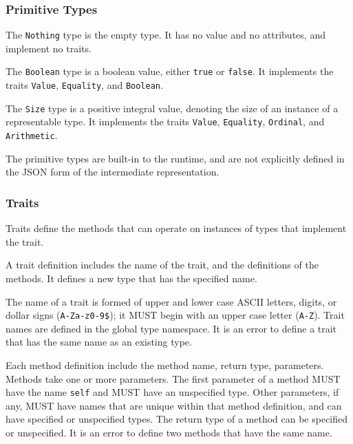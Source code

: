 \documentclass[10pt,twocolumn,a4paper]{article}
\newcommand{\code}[1]{\texttt{#1}}
\begin{document}
\subsubsection{Primitive Types}
\label{sec:primitives}

The \code{Nothing} type is the empty type. It has no value and no attributes,
and implement no traits.

The \code{Boolean} type is a boolean value, either \code{true} or \code{false}.
It implements the traits \code{Value}, \code{Equality}, and \code{Boolean}.

The \code{Size} type is a positive integral value, denoting the size of an
instance of a representable type. It implements the traits \code{Value},
\code{Equality}, \code{Ordinal}, and \code{Arithmetic}.

The primitive types are built-in to the runtime, and are not explicitly
defined in the JSON form of the intermediate representation.

\subsubsection{Traits}
\label{sec:traits}

Traits define the methods that can operate on instances of types that
implement the trait.

A trait definition includes the name of the trait, and the definitions
of the methods. It defines a new type that has the specified name.

The name of a trait is formed of upper and lower case ASCII letters,
digits, or dollar signs (\code{A-Za-z0-9\$}); it MUST begin with an
upper case letter (\code{A-Z}). Trait names are defined in the global type
namespace.  It is an error to define a trait that has the same name as an
existing type.

Each method definition include the method name, return type, parameters.
Methods take one or more parameters.
The first parameter of a method MUST have the name \code{self} and MUST
have an unspecified type.
Other parameters, if any, MUST have names that are unique within that
method definition, and can have specified or unspecified types.
The return type of a method can be specified or unspecified.  
It is an error to define two methods that have the same name.
\end{document}
